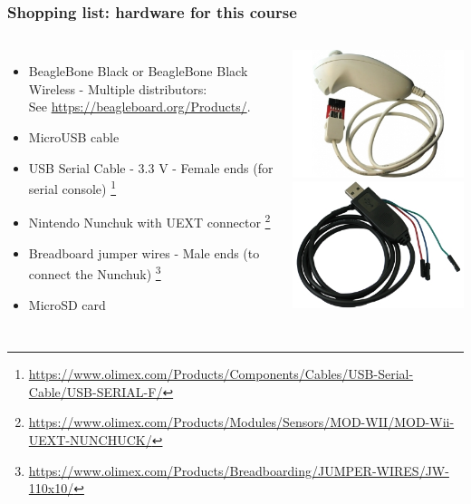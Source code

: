 \begin{frame}
\frametitle{Shopping list: hardware for this course}
  \begin{columns}
    \footnotesize
    \begin{itemize}
    \item BeagleBone Black or BeagleBone Black Wireless - Multiple distributors: \\
      See \url{https://beagleboard.org/Products/}.
    \item MicroUSB cable
    \item USB Serial Cable - 3.3 V - Female ends (for serial console)
      \footnote{\tiny \url{https://www.olimex.com/Products/Components/Cables/USB-Serial-Cable/USB-SERIAL-F/}}
    \item Nintendo Nunchuk with UEXT connector
      \footnote{\tiny \url{https://www.olimex.com/Products/Modules/Sensors/MOD-WII/MOD-Wii-UEXT-NUNCHUCK/}}
    \item Breadboard jumper wires - Male ends (to connect the Nunchuk)
      \footnote{\tiny \url{https://www.olimex.com/Products/Breadboarding/JUMPER-WIRES/JW-110x10/}}
    \item MicroSD card
    \end{itemize}
    \includegraphics[height=0.25\textheight]{common/nunchuk.jpg} \\
    \includegraphics[height=0.20\textheight]{common/usb-serial-cable-female.png} \\

\end{columns}
\end{frame}
